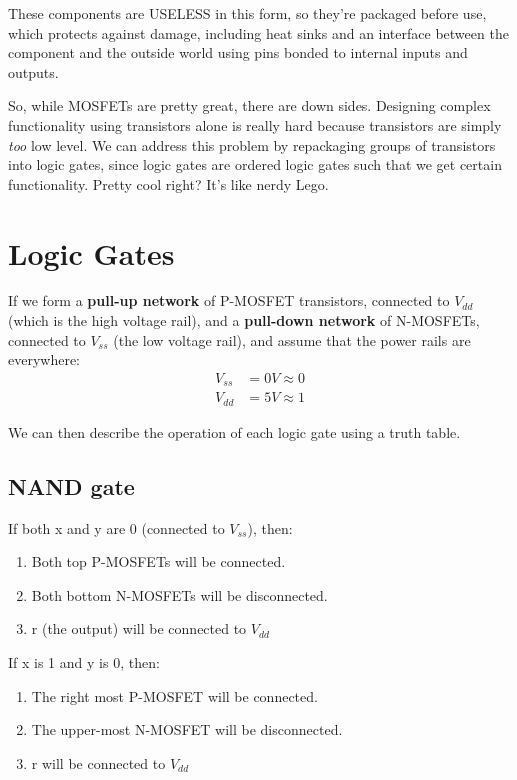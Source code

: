 \documentclass[11pt,a4paper,titlepage,dvipsnames,cmyk]{scrartcl}
\begin{document}
These components are USELESS in this form, so they're packaged before use, which
protects against damage, including heat sinks and an interface between the
component and the outside world using pins bonded to internal inputs and
outputs.

So, while MOSFETs are pretty great, there are down sides. Designing
complex functionality using transistors alone is really hard because
transistors are simply \textit{too} low level. We can address this problem
by repackaging groups of transistors into logic gates, since logic gates
are ordered logic gates such that we get certain functionality. Pretty
cool right? It's like nerdy Lego.

\section{Logic Gates}%
\label{sec:logic-gates}
If we form a \textbf{pull-up network} of P-MOSFET transistors, connected
to $V_{dd}$ (which is the high voltage rail), and a \textbf{pull-down
network} of N-MOSFETs, connected to $V_{ss}$ (the low voltage rail), and
assume that the power rails are everywhere:
\begin{align*}
    V_{ss} &= 0V \approx 0 \\
    V_{dd} &= 5V \approx 1
\end{align*}

We can then describe the operation of each logic gate using a truth table.

\subsection{NAND gate}%
\label{sub:nand}
If both x and y are 0 (connected to $V_{ss}$), then:
\begin{enumerate}
    \item Both top P-MOSFETs will be connected.
    \item Both bottom N-MOSFETs will be disconnected.
    \item r (the output) will be connected to $V_{dd}$
\end{enumerate}

If x is 1 and y is 0, then:
\begin{enumerate}
    \item The right most P-MOSFET will be connected.
    \item The upper-most N-MOSFET will be disconnected.
    \item r will be connected to $V_{dd}$
\end{enumerate}
\end{document}
